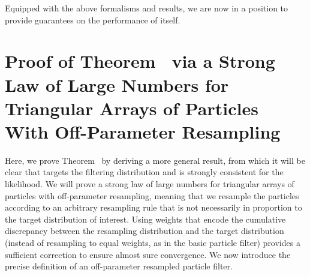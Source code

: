\vspace{3mm}

Equipped with the above formalisms and results, we are now in a position to provide guarantees on the performance of  itself. 



\section[Strong Law of Large Numbers for Off-Parameter Particle Filters]{Proof of Theorem~{\thmMopTargeting} via a Strong Law of Large Numbers for Triangular Arrays of Particles With Off-Parameter Resampling}
\label{sec:app07-s4}
\label{appendix:targeting}



Here, we prove Theorem~{\thmMopTargeting} by deriving a more general result, from which it will be clear that  targets the filtering distribution and is strongly consistent for the likelihood.
We will prove a strong law of large numbers for triangular arrays of particles with off-parameter resampling, meaning that we resample the particles according to an arbitrary resampling rule that is not necessarily in proportion to the target distribution of interest. 
Using weights that encode the cumulative discrepancy between the resampling distribution and the target distribution (instead of resampling to equal weights, as in the basic particle filter) provides a sufficient correction to ensure almost sure convergence.
We now introduce the precise definition of an off-parameter resampled particle filter. 

